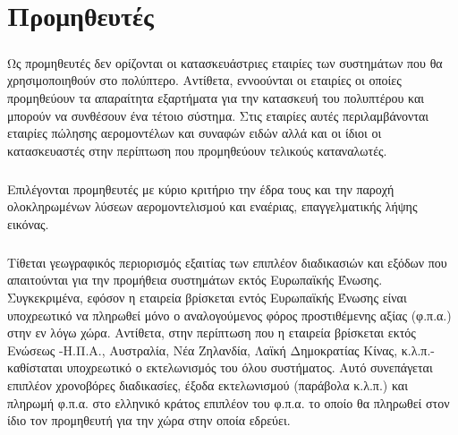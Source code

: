 \documentclass[a4paper, 12pt, twoside]{report}
\begin{document}
	\chapter{Προμηθευτές}
		\paragraph{}{Ως προμηθευτές δεν ορίζονται οι κατασκευάστριες εταιρίες των συστημάτων που θα χρησιμοποιηθούν στο πολύπτερο. Αντίθετα, εννοούνται οι εταιρίες οι οποίες προμηθεύουν τα απαραίτητα εξαρτήματα για την κατασκευή του πολυπτέρου και μπορούν να συνθέσουν ένα τέτοιο σύστημα. Στις εταιρίες αυτές περιλαμβάνονται εταιρίες πώλησης αερομοντέλων και συναφών ειδών αλλά και οι ίδιοι οι κατασκευαστές στην περίπτωση που προμηθεύουν τελικούς καταναλωτές.
		}
		
		\paragraph{}{Επιλέγονται προμηθευτές με κύριο κριτήριο την έδρα τους και την παροχή ολοκληρωμένων λύσεων αερομοντελισμού και εναέριας, επαγγελματικής λήψης εικόνας. 
		}
		\paragraph{}{Τίθεται γεωγραφικός περιορισμός εξαιτίας των επιπλέον διαδικασιών και εξόδων που απαιτούνται για την προμήθεια συστημάτων εκτός Ευρωπαϊκής Ένωσης. Συγκεκριμένα, εφόσον η εταιρεία βρίσκεται εντός Ευρωπαϊκής Ένωσης είναι υποχρεωτικό να πληρωθεί μόνο ο αναλογούμενος φόρος προστιθέμενης αξίας (φ.π.α.) στην εν λόγω χώρα. Αντίθετα, στην περίπτωση που η εταιρεία βρίσκεται εκτός Ενώσεως -Η.Π.Α., Αυστραλία, Νέα Ζηλανδία, Λαϊκή Δημοκρατίας Κίνας, κ.λ.π.- καθίσταται υποχρεωτικό ο εκτελωνισμός του όλου συστήματος. Αυτό συνεπάγεται επιπλέον χρονοβόρες διαδικασίες, έξοδα εκτελωνισμού (παράβολα κ.λ.π.) και πληρωμή φ.π.α. στο ελληνικό κράτος επιπλέον του φ.π.α. το οποίο θα πληρωθεί στον ίδιο τον προμηθευτή για την χώρα στην οποία εδρεύει.
		}
		
\end{document}
